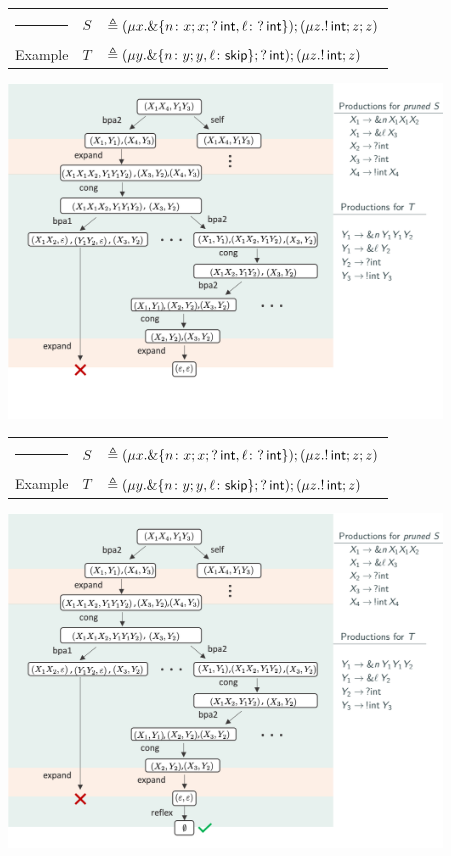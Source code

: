 \documentclass[10pt]{beamer}
\begin{document}
\begin{frame}
	\begin{tabular} {l l l }
  		{\color{teal}\rule{3cm}{2pt}} &  $S$ &$\triangleq (\mu x. \&\{n\colon x;x;?\,\mathsf{int},
      \ell\colon ?\,\mathsf{int} \});( \mu z. !\,\mathsf{int}; z;z )$\\
  		{\color{teal} Example}  &  $T$ &$\triangleq (\mu y. \&\{n\colon y;y,
      \ell\colon \mathsf{skip} \}; ?\,\mathsf{int}); (\mu z. !\,\mathsf{int}; z)$
	\end{tabular}
	\vspace*{2mm}
	\includegraphics[width=11.5cm]{img/exemplo-1}\smallskip
\end{frame}

\begin{frame}
	\begin{tabular} {l l l }
  		{\color{teal}\rule{3cm}{2pt}} &  $S$ &$\triangleq (\mu x. \&\{n\colon x;x;?\,\mathsf{int},
      \ell\colon ?\,\mathsf{int} \});( \mu z. !\,\mathsf{int}; z;z )$\\
  		{\color{teal} Example}  &  $T$ &$\triangleq (\mu y. \&\{n\colon y;y,
      \ell\colon \mathsf{skip} \}; ?\,\mathsf{int}); (\mu z. !\,\mathsf{int}; z)$
	\end{tabular}
	\vspace*{2mm}
	\includegraphics[width=11.5cm]{img/example_expansion_tree}\smallskip
\end{frame}
\end{document}
